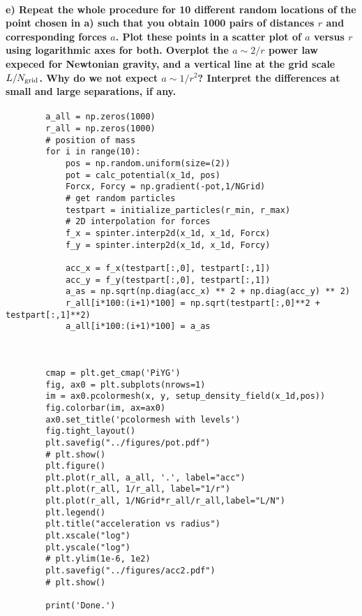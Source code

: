 \paragraph{e) Repeat the whole procedure for 10 different random locations of 
    the point chosen in a) such that you obtain 1000 pairs of distances $r$ and 
    corresponding forces $a$. Plot these points in a scatter plot of $a$ versus
    $r$ using logarithmic axes for both. Overplot the $a\sim2/r$ power law 
    expeced for Newtonian gravity, and a vertical line at the grid scale 
    $L/N_\textnormal{grid}$. Why do we not expect $a\sim1/r^2$? Interpret the 
    differences at small and large separations, if any.
}
    \begin{lstlisting}
        a_all = np.zeros(1000)
        r_all = np.zeros(1000)
        # position of mass
        for i in range(10):
            pos = np.random.uniform(size=(2))
            pot = calc_potential(x_1d, pos)
            Forcx, Forcy = np.gradient(-pot,1/NGrid)
            # get random particles
            testpart = initialize_particles(r_min, r_max)
            # 2D interpolation for forces
            f_x = spinter.interp2d(x_1d, x_1d, Forcx)
            f_y = spinter.interp2d(x_1d, x_1d, Forcy)
        
            acc_x = f_x(testpart[:,0], testpart[:,1])
            acc_y = f_y(testpart[:,0], testpart[:,1])
            a_as = np.sqrt(np.diag(acc_x) ** 2 + np.diag(acc_y) ** 2)
            r_all[i*100:(i+1)*100] = np.sqrt(testpart[:,0]**2 + testpart[:,1]**2)
            a_all[i*100:(i+1)*100] = a_as
        
        
        
        cmap = plt.get_cmap('PiYG')
        fig, ax0 = plt.subplots(nrows=1)
        im = ax0.pcolormesh(x, y, setup_density_field(x_1d,pos))
        fig.colorbar(im, ax=ax0)
        ax0.set_title('pcolormesh with levels')
        fig.tight_layout()
        plt.savefig("../figures/pot.pdf")
        # plt.show()
        plt.figure()
        plt.plot(r_all, a_all, '.', label="acc")
        plt.plot(r_all, 1/r_all, label="1/r")
        plt.plot(r_all, 1/NGrid*r_all/r_all,label="L/N")
        plt.legend()
        plt.title("acceleration vs radius")
        plt.xscale("log")
        plt.yscale("log")
        # plt.ylim(1e-6, 1e2)
        plt.savefig("../figures/acc2.pdf")
        # plt.show()
        
        print('Done.')\end{lstlisting}
